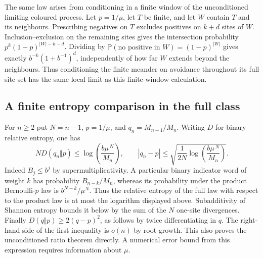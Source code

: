 The same law arises from conditioning in a finite window of the
unconditioned limiting coloured process. Let \(p=1/\mu\), let \(T\) be
finite, and let \(W\) contain \(T\) and its neighbours. Prescribing
negatives on \(T\) excludes positives on \(k+d\) sites of \(W\).
Inclusion--exclusion on the remaining sites gives the intersection
probability \(p^k(1-p)^{|W|-k-d}\). Dividing by
\(\mathbb P(\text{no positive in }W)=(1-p)^{|W|}\) gives exactly
\(b^{-k}(1+b^{-1})^d\), independently of how far \(W\) extends beyond
the neighbours. Thus conditioning the finite meander on avoidance
throughout its full site set has the same local limit as this
finite-window calculation.

\subsection*{A finite entropy comparison in the full class}
For \(n\ge2\) put \(N=n-1\), \(p=1/\mu\), and \(q_n=M_{n-1}/M_n\).
Writing \(D\) for binary relative entropy, one has
\[
 N D(q_n\Vert p)\le
      \log\!\left(\frac{b\mu^{\,N}}{M_n}\right),\qquad
 |q_n-p|\le
      \sqrt{\frac{1}{2N}\log\!\left(\frac{b\mu^{\,N}}{M_n}\right)}.
\]
Indeed \(B_j\le b^j\) by supermultiplicativity. A particular binary
indicator word of weight \(k\) has probability \(B_{n-k}/M_n\),
whereas its probability under the product Bernoulli-\(p\) law is
\(b^{N-k}/\mu^N\). Thus the relative entropy of the full law with
respect to the product law is at most the logarithm displayed above.
Subadditivity of Shannon entropy bounds it below by the sum of the
\(N\) one-site divergences. Finally \(D(q\Vert p)\ge2(q-p)^2\),
as follows by twice differentiating in \(q\). The right-hand side of
the first inequality is \(o(n)\) by root growth. This also proves the
unconditioned ratio theorem directly. A numerical error bound from
this expression requires information about \(\mu\).
